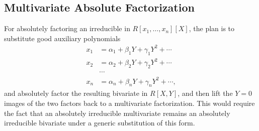 \documentclass[11pt,reqno]{amsart}
\numberwithin{equation}{section}
\begin{document}
\subsection{Multivariate Absolute Factorization}
For absolutely factoring  an irreducible in $R[x_1,\dots,x_n][X]$, the plan is 
to substitute good auxiliary polynomials
\begin{align*}
x_1 &= \alpha_1 + \beta_1 Y + \gamma_1 Y^2 + \cdots\\
x_2 &= \alpha_2 + \beta_2 Y + \gamma_2 Y^2 + \cdots\\
&\cdots\\
x_n &= \alpha_n + \beta_n Y + \gamma_n Y^2 + \cdots\text{,}
\end{align*}
and absolutely factor the resulting bivariate in $R[X,Y]$, and then lift the 
$Y=0$ images of the two factors back to a multivariate factorization. This 
would require the fact that an absolutely irreducible multivariate remains an 
absolutely irreducible bivariate under a generic substitution of this form.
\end{document}
